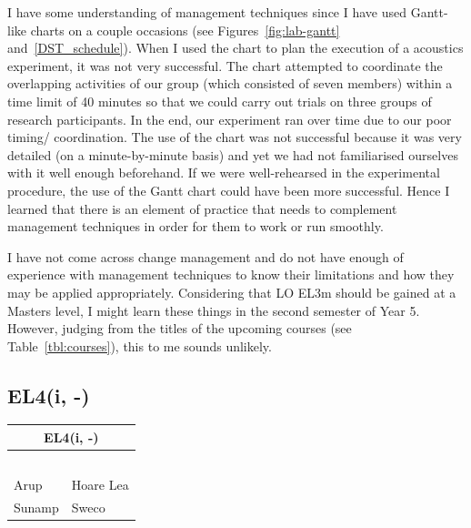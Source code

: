 I have some understanding of management techniques since I have used Gantt-like charts on a couple occasions (see Figures~\ref{fig:lab-gantt} and~\ref{DST_schedule}).
When I used the chart to plan the execution of a \LABTitle \space acoustics experiment, it was not very successful.
The chart attempted to coordinate the overlapping activities of our group (which consisted of seven members) within a time limit of 40 minutes so that we could carry out trials on three groups of research participants.
In the end, our experiment ran over time due to our poor timing/ coordination.
The use of the chart was not successful because it was very detailed (on a minute-by-minute basis) and yet we had not familiarised ourselves with it well enough beforehand.
If we were well-rehearsed in the experimental procedure, the use of the Gantt chart could have been more successful.
Hence I learned that there is an element of practice that needs to complement management techniques in order for them to work or run smoothly.

I have not come across change management and do not have enough of experience with management techniques to know their limitations and how they may be applied appropriately.
Considering that LO EL3m should be gained at a Masters level, I might learn these things in the second semester of Year 5.
However, judging from the titles of the upcoming courses (see Table~\ref{tbl:courses}), this to me sounds unlikely.





\subsection*{EL4(i, -)}

\begin{table}
	\begin{tabular}{|ll|}
		\hline
		\multicolumn{2}{|c|}{\cellcolor[HTML]{F8A102}\textbf{EL4(i, -)} \master} \\ \hline
		\IE & \DPA \\
		\CAS & \EnBldgs \\
		\DI & \FMP \\
		\SIB & \CCSA \\
		\WSD &  \\
		Arup & Hoare Lea \\
		Sunamp & Sweco \\ \hline
	\end{tabular}
\end{table}

